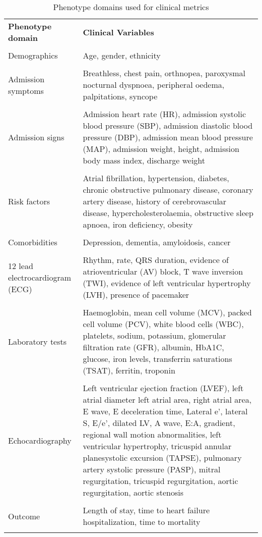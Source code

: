 \documentclass{article}
\begin{document}
\begin{longtable}{p{}  p{}}
    \caption{Phenotype domains used for clinical metrics}\vspace*{-0,1cm}\\
    \toprule
    \textbf{Phenotype domain} & \textbf{Clinical Variables}\\
    \midrule
\endhead
&\\
Demographics & Age, gender, ethnicity\\
&\\
Admission symptoms & Breathless, chest pain, orthnopea, paroxysmal nocturnal dyspnoea, peripheral oedema, palpitations, syncope\\
&\\
Admission signs & Admission heart rate (HR), admission systolic blood pressure (SBP), admission diastolic blood pressure (DBP), admission mean blood pressure (MAP), admission weight, height, admission body mass index, discharge weight\\
&\\
Risk factors & Atrial fibrillation, hypertension, diabetes, chronic obstructive pulmonary disease, coronary artery disease, history of cerebrovascular disease, hypercholesterolaemia, obstructive sleep apnoea, iron deficiency, obesity\\
&\\
Comorbidities & Depression, dementia, amyloidosis, cancer\\
&\\
12 lead electrocardiogram (ECG) & Rhythm, rate, QRS duration, evidence of atrioventricular (AV) block, T wave inversion (TWI), evidence of left ventricular hypertrophy (LVH), presence of pacemaker\\
&\\
Laboratory tests & Haemoglobin, mean cell volume (MCV), packed cell volume (PCV), white blood cells (WBC), platelets, sodium, potassium, glomerular filtration rate (GFR), albumin, HbA1C, glucose, iron levels, transferrin saturations (TSAT), ferritin, troponin\\
&\\
Echocardiography & Left ventricular ejection fraction (LVEF), left atrial diameter left atrial area, right atrial area, E wave, E deceleration time, Lateral e’, lateral S, E/e’, dilated LV, A wave, E:A, gradient, regional wall motion abnormalities, left ventricular hypertrophy, tricuspid annular planesystolic excursion (TAPSE), pulmonary artery systolic pressure (PASP), mitral regurgitation, tricuspid regurgitation, aortic regurgitation, aortic stenosis\\
&\\
Outcome & Length of stay, time to heart failure hospitalization, time to mortality\\
&\\
\midrule
\end{longtable}
\end{document}

